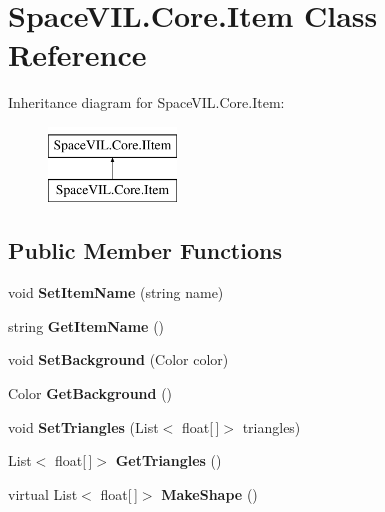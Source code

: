 \hypertarget{class_space_v_i_l_1_1_core_1_1_item}{}\section{Space\+V\+I\+L.\+Core.\+Item Class Reference}
\label{class_space_v_i_l_1_1_core_1_1_item}
Inheritance diagram for Space\+V\+I\+L.\+Core.\+Item\+:\begin{figure}[H]
\begin{center}
\leavevmode
\includegraphics[height=2.000000cm]{class_space_v_i_l_1_1_core_1_1_item}
\end{center}
\end{figure}
\subsection*{Public Member Functions}
\begin{DoxyCompactItemize}
\item 
\mbox{\label{class_space_v_i_l_1_1_core_1_1_item_a351f931000e819ecb8f586c17516106c}} 
void {\bfseries Set\+Item\+Name} (string name)
\item 
\mbox{\label{class_space_v_i_l_1_1_core_1_1_item_a937e7a85e84111ba799c5948980e793c}} 
string {\bfseries Get\+Item\+Name} ()
\item 
\mbox{\label{class_space_v_i_l_1_1_core_1_1_item_a28c69788c979a8fff9c8d91f0a0c6399}} 
void {\bfseries Set\+Background} (Color color)
\item 
\mbox{\label{class_space_v_i_l_1_1_core_1_1_item_a0ac08fb11f258cc096c5904f424a7f9c}} 
Color {\bfseries Get\+Background} ()
\item 
\mbox{\label{class_space_v_i_l_1_1_core_1_1_item_aa1133d3ba77cd7eb6a03293b7c53784a}} 
void {\bfseries Set\+Triangles} (List$<$ float\mbox{[}$\,$\mbox{]}$>$ triangles)
\item 
\mbox{\label{class_space_v_i_l_1_1_core_1_1_item_a6cb2bd1db9708ff155e8cf2c90cc2a00}} 
List$<$ float\mbox{[}$\,$\mbox{]}$>$ {\bfseries Get\+Triangles} ()
\item 
\mbox{\label{class_space_v_i_l_1_1_core_1_1_item_a716e8e26262704e89720dd183d38376f}} 
virtual List$<$ float\mbox{[}$\,$\mbox{]}$>$ {\bfseries Make\+Shape} ()
\end{DoxyCompactItemize}
